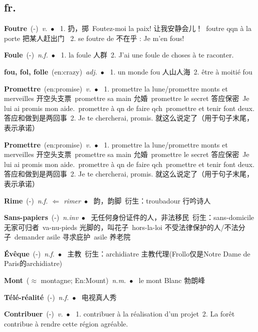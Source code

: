 \documentclass[10pt,a4paper,twoside]{article} %
\newcommand{\entry}[4]{\textbf{#1}\ {(#2)}\ \textit{#3}\ $\bullet$\ {#4}} %
\begin{document}
\begin{CJK*}{UTF8}{gkai}

\section*{fr.}

\begin{multicols}{2}



\entry{Foutre}{-}{v.}
{
1. 扔，掷\ 
Foutez-moi la paix!  让我安静会儿！\ 
foutre qqn à la porte 把某人赶出门 \ 
2. se foutre de 不在乎 : Je m'en fous!
}

\entry{Foule}{-}{n.f.}
{
1. la foule 人群\ 
2. J'ai une foule de choses à te raconter.
}

\entry{fou, fol, folle}{en:crazy}{adj.}
{
1. un monde fou 人山人海\ 
2. être à moitié fou
}

\entry{Promettre}{en:promise}{v.}
{
1. promettre la lune/promettre monts et merveilles 开空头支票\ 
promettre sa main 允婚\ promettre le secret 答应保密\ Je lui ai promis mon aide.\ 
promettre à qn de faire qch\ promettre et tenir font deux. 答应和做到是两回事\  
2. Je te chercherai, promis. 就这么说定了（用于句子末尾，表示承诺）
}

\entry{Promettre}{en:promise}{v.}
{
1. promettre la lune/promettre monts et merveilles 开空头支票\  
promettre sa main 允婚\ promettre le secret 答应保密\ Je lui ai promis mon aide.\  
promettre à qn de faire qch\ promettre et tenir font deux. 答应和做到是两回事\ 
2. Je te chercherai, promis. 就这么说定了（用于句子末尾，表示承诺）
}

\entry{Rime}{-}{n.f. $\Leftarrow$ rimer}
{
韵，韵脚\ 
衍生：troubadour 行吟诗人
}

\entry{Sans-papiers}{-}{n.inv}
{
无任何身份证件的人，非法移民\ 
衍生：sans-domicile 无家可归者\ 
va-nu-pieds 光脚的，叫花子\ 
hors-la-loi 不受法律保护的人/不法分子\ 
demander asile 寻求庇护\ 
asile 养老院\ 
}

\entry{Évêque}{-}{n.f.}
{
主教\ 
衍生：archidiatre 主教代理(Frollo仅是Notre Dame de Paris的archidiatre)
}

\entry{Mont}{$\approx$ montagne; En:Mount}{n.m.}
{
le mont Blanc 勃朗峰
}

\entry{Télé-réalité}{-}{n.f.}
{
电视真人秀
}

\entry{Contribuer}{-}{v.}
{
1. contribuer à la réalisation d'un projet\ 
2. La forêt contribue à rendre cette région agréable. 
}


\end{multicols}
\end{CJK*}
\end{document}
